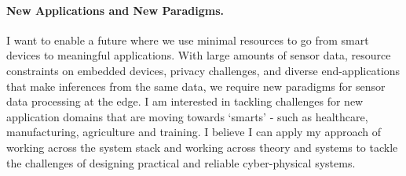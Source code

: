 \documentclass[10pt]{article}
\begin{document}
\paragraph{New Applications and New Paradigms. }
I want to enable a future where we use minimal resources to go from smart devices to meaningful applications. 
With large amounts of sensor data, resource constraints on embedded devices, privacy challenges, and diverse end-applications that make	 inferences from the same data, we require new paradigms for 
sensor data processing at the edge. %
I am interested in tackling challenges for new application domains that are moving towards `smarts' - such as healthcare, manufacturing, agriculture and training. 
I believe I can apply my approach of working across the system stack and working across theory and systems %
to tackle the challenges of designing practical and reliable cyber-physical systems. 



\footnotesize


\end{document}
